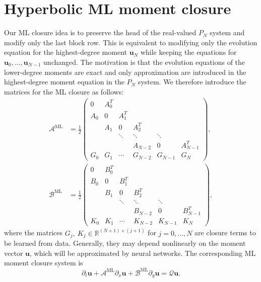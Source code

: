 \documentclass[11pt]{article}
\numberwithin{equation}{section}
\newcommand{\R}{\mathbb{R}}
\newcommand{\vect}[1]{\boldsymbol{#1}}
\newcommand{\half}{\frac{1}{2}}
\begin{document}
\section{Hyperbolic ML moment closure}\label{sec:hyperbolic-ml-closure}

Our ML closure idea is to preserve the head of the real-valued $P_N$ system and modify only the last block row. This is equivalent to modifying only the evolution equation for the highest-degree moment $\vect{u}_N$ while keeping the equations for $\vect{u}_0,\dots,\vect{u}_{N-1}$ unchanged. The motivation is that the evolution equations of the lower-degree moments are exact and only approximation are introduced in the highest-degree moment equation in the $P_N$ system. We therefore introduce the matrices for the ML closure as follows:
\begin{equation}\label{eq:ml-closure-matrix}
\begin{aligned}
\mathcal{A}^{\textrm{ML}} &=
\half
\begin{pmatrix}
0 & A_0^T \\
A_0 & 0 & A_1^T \\
& A_1 & 0 & A_2^T \\
& & \ddots & \ddots & \ddots \\
& & & A_{N-2} & 0 & A_{N-1}^T \\
G_0 & G_1 & \cdots & G_{N-2} & G_{N-1} & G_N
\end{pmatrix},
\\[0.5ex]
\mathcal{B}^{\textrm{ML}} &=
\half
\begin{pmatrix}
0 & B_0^T \\
B_0 & 0 & B_1^T \\
& B_1 & 0 & B_2^T \\
& & \ddots & \ddots & \ddots \\
& & & B_{N-2} & 0 & B_{N-1}^T \\
K_0 & K_1 & \cdots & K_{N-2} & K_{N-1} & K_N
\end{pmatrix},
\end{aligned}
\end{equation}
where the matrices $G_j,\ K_j \in \R^{(N+1)\times(j+1)}$ for $j=0,\dots,N$ are closure terms to be learned from data. Generally, they may depend nonlinearly on the moment vector $\vect{u}$, which will be approximated by neural networks. The corresponding ML moment closure system is
\begin{equation}\label{eq:closed-system}
    \partial_t \vect{u} + \mathcal{A}^{\textrm{ML}} \partial_x \vect{u} + \mathcal{B}^{\textrm{ML}} \partial_y \vect{u} = \mathcal{Q}\vect{u}.
\end{equation}
\end{document}
